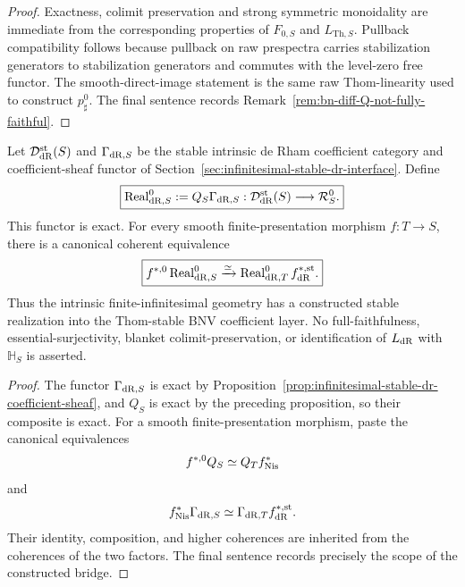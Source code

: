 \begin{proof}
Exactness, colimit preservation and strong symmetric monoidality are immediate
from the corresponding properties of \(F_{0,S}\) and
\(L_{\mathrm{Th},S}\).  Pullback compatibility follows because pullback on raw
prespectra carries stabilization generators to stabilization generators and
commutes with the level-zero free functor.  The smooth-direct-image statement
is the same raw Thom-linearity used to construct \(p_\sharp^0\).  The final
sentence records Remark~\ref{rem:bn-diff-Q-not-fully-faithful}.
\end{proof}

\begin{theorem}
\label{thm:bn-diff-intrinsic-dr-realization}
Let \(\mathcal D_{\mathrm{dR}}^{\mathrm{st}}(S)\) and \(\Gamma_{\mathrm{dR},S}\) be the
stable intrinsic de Rham coefficient category and coefficient-sheaf functor of
Section~\ref{sec:infinitesimal-stable-dr-interface}.  Define
\[
  \boxed{
  \operatorname{Real}_{\mathrm{dR},S}^0
  :=
  Q_S\Gamma_{\mathrm{dR},S}:
  \mathcal D_{\mathrm{dR}}^{\mathrm{st}}(S)
  \longrightarrow
  \mathcal R_S^0.
  }
\]
This functor is exact.  For every smooth finite-presentation morphism
\(f:T\to S\), there is a canonical coherent equivalence
\[
  \boxed{
  f^{*,0}\operatorname{Real}_{\mathrm{dR},S}^0
  \xrightarrow{\simeq}
  \operatorname{Real}_{\mathrm{dR},T}^0f_{\mathrm{dR}}^{*,\mathrm{st}}.
  }
\]
Thus the intrinsic finite-infinitesimal geometry has a constructed stable
realization into the Thom-stable BNV coefficient layer.  No full-faithfulness,
essential-surjectivity, blanket colimit-preservation, or identification of
\(L_{\mathrm{dR}}\) with \(\mathbb H_S\) is asserted.
\end{theorem}

\begin{proof}
The functor \(\Gamma_{\mathrm{dR},S}\) is exact by
Proposition~\ref{prop:infinitesimal-stable-dr-coefficient-sheaf}, and \(Q_S\)
is exact by the preceding proposition, so their composite is exact.  For a
smooth finite-presentation morphism, paste the canonical equivalences
\[
  f^{*,0}Q_S\simeq Q_Tf^*_{\mathrm{Nis}}
\]
and
\[
  f^*_{\mathrm{Nis}}\Gamma_{\mathrm{dR},S}
  \simeq
  \Gamma_{\mathrm{dR},T}f_{\mathrm{dR}}^{*,\mathrm{st}}.
\]
Their identity, composition, and higher coherences are inherited from the
coherences of the two factors.  The final sentence records precisely the scope
of the constructed bridge.
\end{proof}

